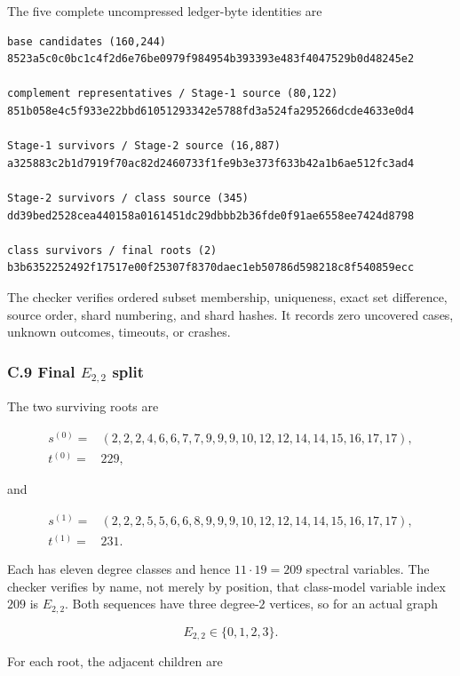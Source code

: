 \documentclass[
  english,
  11pt,
  a4paper,
]{article}
\begin{document}
The five complete uncompressed ledger-byte identities are

\begin{verbatim}
base candidates (160,244)
8523a5c0c0bc1c4f2d6e76be0979f984954b393393e483f4047529b0d48245e2

complement representatives / Stage-1 source (80,122)
851b058e4c5f933e22bbd61051293342e5788fd3a524fa295266dcde4633e0d4

Stage-1 survivors / Stage-2 source (16,887)
a325883c2b1d7919f70ac82d2460733f1fe9b3e373f633b42a1b6ae512fc3ad4

Stage-2 survivors / class source (345)
dd39bed2528cea440158a0161451dc29dbbb2b36fde0f91ae6558ee7424d8798

class survivors / final roots (2)
b3b6352252492f17517e00f25307f8370daec1eb50786d598218c8f540859ecc
\end{verbatim}

The checker verifies ordered subset membership, uniqueness, exact set
difference, source order, shard numbering, and shard hashes. It records
zero uncovered cases, unknown outcomes, timeouts, or crashes.

\subsubsection{\texorpdfstring{C.9 Final \(E_{2,2}\)
split}{C.9 Final E\_\{2,2\} split}}\label{c.9-final-e_22-split}

The two surviving roots are

\[
\begin{aligned}
s^{(0)}={}&(2,2,2,4,6,6,7,7,9,9,9,10,12,12,14,14,15,16,17,17),\\
t^{(0)}={}&229,
\end{aligned}
\tag{C.47}
\]

and

\[
\begin{aligned}
s^{(1)}={}&(2,2,2,5,5,6,6,8,9,9,9,10,12,12,14,14,15,16,17,17),\\
t^{(1)}={}&231.
\end{aligned}
\tag{C.48}
\]

Each has eleven degree classes and hence \(11\cdot19=209\) spectral
variables. The checker verifies by name, not merely by position, that
class-model variable index \(209\) is \(E_{2,2}\). Both sequences have
three degree-\(2\) vertices, so for an actual graph

\[
E_{2,2}\in\{0,1,2,3\}.
\tag{C.49}
\]

For each root, the adjacent children are
\end{document}
